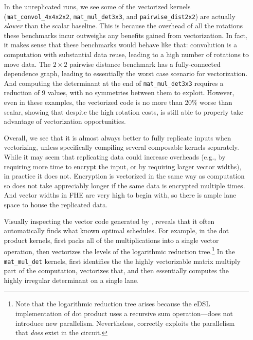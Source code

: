 In the unreplicated runs, we see some of the vectorized kernels (\texttt{mat\-\_convol\-\_4x4x2x2}, \texttt{mat\-\_mul\-\_det3x3}, and \texttt{pair\-wise\-\_dist2x2}) are actually {\em slower} than the scalar baseline.
This is because the overhead of all the rotations these benchmarks incur outweighs any benefits gained from vectorization.
In fact, it makes sense that these benchmarks would behave like that: convolution is a computation with substantial data reuse, leading to a high number of rotations to move data.
The $2 \times 2$ pairwise distance benchmark has a fully-connected dependence graph, leading to essentially the worst case scenario for vectorization.
And computing the determinant at the end of \texttt{mat\_mul\_det3x3} requires a reduction of 9 values, with no symmetries between them to exploit.
However, even in these examples, the vectorized code is no more than 20\% worse than scalar, showing that despite the high rotation costs, \system is still able to properly take advantage of vectorization opportunities.

Overall, we see that it is almost always better to fully replicate inputs when vectorizing, unless specifically compiling several composable kernels separately. While it may seem that replicating data could increase overheads (e.g., by requiring more time to encrypt the input, or by requiring larger vector widths), in practice it does not. Encryption is vectorized in the same way as computation so does not take appreciably longer if the same data is encrypted multiple times. And vector widths in FHE are very high to begin with, so there is ample lane space to house the replicated data.

Visually inspecting the vector code generated by \system, reveals that it often automatically finds what known optimal schedules.
For example, in the dot product kernels, \system first packs all of the multiplications into a single vector operation, then vectorizes the levels of the logarithmic reduction tree.\footnote{Note that the logarithmic reduction tree arises because the eDSL implementation of dot product uses a recursive sum operation---\system does not introduce new parallelism. Nevertheless, \system correctly exploits the parallelism that {\em does} exist in the circuit.}
In the \texttt{mat\_mul\_det} kernels, \system first identifies the the highly vectorizable matrix multiply part of the computation, vectorizes that, and then essentially computes the highly irregular determinant on a single lane.

